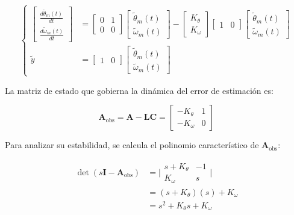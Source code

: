 \documentclass[blue,fullpaper]{ludusofficial}  %
\begin{document}
\[
\left\{
\begin{aligned}
\begin{bmatrix} \frac{d \tilde{\theta}_{m}(t) }{dt} \\ \frac{d \tilde{\omega}_{m}(t) }{dt}  \end{bmatrix} 
 & = \begin{bmatrix} 0 & 1 \\0 & 0 \end{bmatrix} \begin{bmatrix} \tilde{\theta}_{m}(t) \\ \tilde{\omega}_{m}(t) \end{bmatrix} - \begin{bmatrix} K_{\theta} \\ K_{\omega} \end{bmatrix} \begin{bmatrix} 1 & 0 \end{bmatrix} \begin{bmatrix} \tilde{\theta}_{m}(t) \\ \tilde{\omega}_{m}(t) \end{bmatrix} \\
\tilde{y} & = \begin{bmatrix} 1 & 0 \end{bmatrix} \begin{bmatrix} \tilde{\theta}_{m}(t) \\ \tilde{\omega}_{m}(t) \end{bmatrix}
\end{aligned}
\right.
\]

La matriz de estado que gobierna la dinámica del error de estimación es:

\[
\mathbf{A}_{\text{obs}} = \mathbf{A}-\mathbf{L}\mathbf{C} = \begin{bmatrix}
-K_{\theta} & 1 \\
-K_{\omega} & 0
\end{bmatrix}
\]

Para analizar su estabilidad, se calcula el polinomio característico de $\mathbf{A}_{\text{obs}}$:

\begin{align}
\det(s\mathbf{I}-\mathbf{A}_{\text{obs}}) &  = \Bigg| \begin{matrix}
s+K_{\theta} & -1 \\
K_{\omega} & s
\end{matrix} \Bigg|  \\
 & = (s+K_{\theta})(s)+K_{\omega} \\
 & = s^{2}+K_{\theta}s+K_{\omega}
\end{align}
\end{document}
